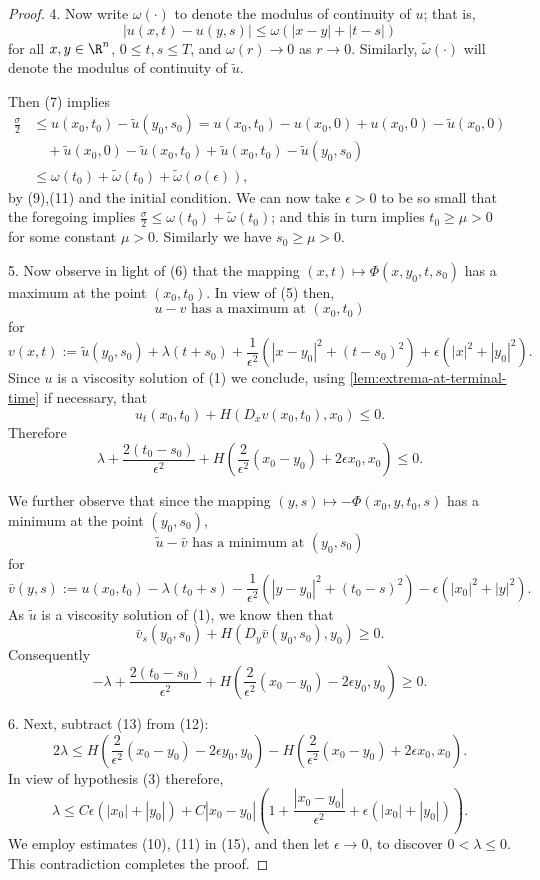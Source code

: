 \begin{proof}
4. Now write $\omega(\cdot)$ to denote the modulus of continuity of $u$; that is,
\[
|u(x,t) - u(y,s)| \leq \omega(|x-y| + |t-s|)
\]
for all $x, y \in \R^n$, $0 \leq t, s \leq T$, and $\omega(r) \to 0$ as $r \to 0$. Similarly, $\tilde{\omega}(\cdot)$ will denote the modulus of continuity of $\tilde{u}$.

Then (7) implies
\[
\begin{aligned}
\frac{\sigma}{2} &\leq u(x_0,t_0) - \tilde{u}(y_0,s_0) = u(x_0,t_0) - u(x_0,0) + u(x_0,0) - \tilde{u}(x_0,0) \\
&\quad + \tilde{u}(x_0,0) - \tilde{u}(x_0,t_0) + \tilde{u}(x_0,t_0) - \tilde{u}(y_0,s_0) \\
&\leq \omega(t_0) + \tilde{\omega}(t_0) + \tilde{\omega}(o(\epsilon)),
\end{aligned}
\]
by (9),(11) and the initial condition. We can now take $\epsilon > 0$ to be so small that the foregoing implies $\frac{\sigma}{2} \leq \omega(t_0) + \tilde{\omega}(t_0)$; and this in turn implies $t_0 \geq \mu > 0$ for some constant $\mu > 0$. Similarly we have $s_0 \geq \mu > 0$.

5. Now observe in light of (6) that the mapping $(x,t) \mapsto \Phi(x,y_0,t,s_0)$ has a maximum at the point $(x_0,t_0)$. In view of (5) then,
\[
u - v \text{ has a maximum at } (x_0,t_0)
\]
for
\[
v(x,t) := \tilde{u}(y_0,s_0) + \lambda(t + s_0) + \frac{1}{\epsilon^2}(|x - y_0|^2 + (t - s_0)^2) + \epsilon(|x|^2 + |y_0|^2).
\]
Since $u$ is a viscosity solution of (1) we conclude, using \cref{lem:extrema-at-terminal-time} if necessary, that
\[
u_t(x_0,t_0) + H(D_x v(x_0,t_0), x_0) \leq 0.
\]
Therefore
\[
\lambda + \frac{2(t_0 - s_0)}{\epsilon^2} + H\left(\frac{2}{\epsilon^2}(x_0 - y_0) + 2\epsilon x_0, x_0\right) \leq 0.
\tag{12}
\]

We further observe that since the mapping $(y, s) \mapsto -\Phi(x_0, y, t_0, s)$ has a minimum at the point $(y_0, s_0)$,
\[
\tilde{u} - \bar{v} \text{ has a minimum at } (y_0, s_0)
\]
for
\[
\bar{v}(y, s) := u(x_0, t_0) - \lambda(t_0 + s) - \frac{1}{\epsilon^2}(|y - y_0|^2 + (t_0 - s)^2) - \epsilon(|x_0|^2 + |y|^2).
\]
As $\tilde{u}$ is a viscosity solution of (1), we know then that
\[
\bar{v}_s(y_0, s_0) + H(D_y\bar{v}(y_0, s_0), y_0) \geq 0.
\]
Consequently
\[
-\lambda + \frac{2(t_0 - s_0)}{\epsilon^2} + H\left(\frac{2}{\epsilon^2}(x_0 - y_0) - 2\epsilon y_0, y_0\right) \geq 0.
\tag{13}
\]

6. Next, subtract (13) from (12):
\[
2\lambda \leq H\left(\frac{2}{\epsilon^2}(x_0 - y_0) - 2\epsilon y_0, y_0\right) - H\left(\frac{2}{\epsilon^2}(x_0 - y_0) + 2\epsilon x_0, x_0\right).
\tag{14}
\]
In view of hypothesis (3) therefore,
\[
\lambda \leq C\epsilon(|x_0| + |y_0|) + C|x_0 - y_0|\left(1 + \frac{|x_0 - y_0|}{\epsilon^2} + \epsilon(|x_0| + |y_0|)\right).
\tag{15}
\]
We employ estimates (10), (11) in (15), and then let $\epsilon \to 0$, to discover $0 < \lambda \leq 0$. This contradiction completes the proof.
\end{proof}

